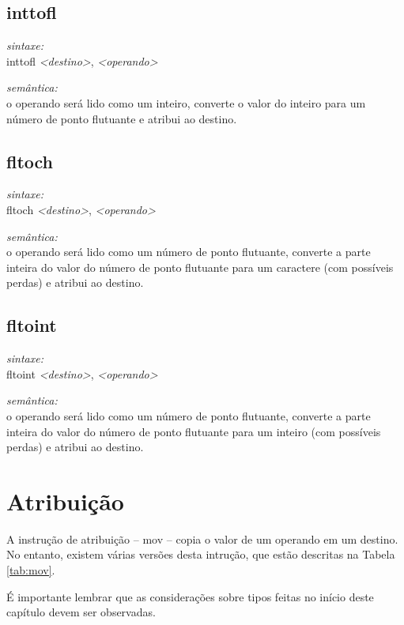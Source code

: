 \documentclass[12pt,a4paper,extrafontsizes,article]{memoir}
\newcommand*{\srcfont}{\fontfamily{pcr}\selectfont}
\begin{document}
\subsection{\textbf{inttofl}}

\textit{sintaxe:}\\{\srcfont inttofl \textit{<destino>}, \textit{<operando>}}

\noindent \textit{semântica:}\\o operando será lido como um inteiro, converte o valor do inteiro para um número de ponto flutuante e atribui
ao destino.


\subsection{\textbf{fltoch}}

\textit{sintaxe:}\\{\srcfont fltoch \textit{<destino>}, \textit{<operando>}}

\noindent \textit{semântica:}\\o operando será lido como um número de ponto flutuante, converte a parte inteira do valor do número de ponto
flutuante para um caractere (com possíveis perdas) e atribui ao destino.


\subsection{\textbf{fltoint}}

\textit{sintaxe:}\\{\srcfont fltoint \textit{<destino>}, \textit{<operando>}}

\noindent \textit{semântica:}\\o operando será lido como um número de ponto flutuante, converte a parte inteira do valor do número de ponto
flutuante para um inteiro (com possíveis perdas) e atribui ao destino.


\section{Atribuição}
\label{sec:mov}

A instrução de atribuição -- {\srcfont mov} -- copia o valor de um operando em um destino. No entanto, existem várias
versões desta intrução, que estão descritas na Tabela \ref{tab:mov}.

É importante lembrar que as considerações sobre tipos feitas no início deste capítulo devem ser observadas.
\end{document}
